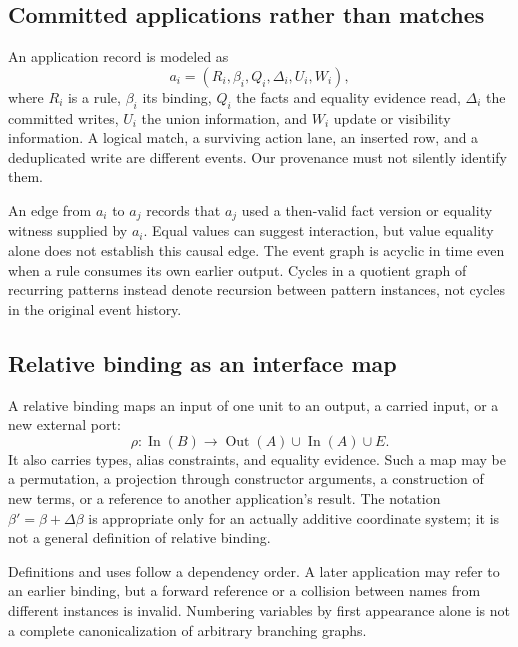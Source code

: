 \documentclass[11pt,a4paper]{article}
\begin{document}
\MathEgraph

\subsection{Committed applications rather than matches}
An application record is modeled as
\begin{equation}
 a_i=(R_i,\beta_i,Q_i,\Delta_i,U_i,W_i),
\end{equation}
where $R_i$ is a rule, $\beta_i$ its binding, $Q_i$ the facts and equality evidence
read, $\Delta_i$ the committed writes, $U_i$ the union information, and $W_i$
update or visibility information. A logical match, a surviving action lane, an
inserted row, and a deduplicated write are different events. Our provenance must
not silently identify them.

An edge from $a_i$ to $a_j$ records that $a_j$ used a then-valid fact version or
equality witness supplied by $a_i$. Equal values can suggest interaction, but
value equality alone does not establish this causal edge. The event graph is
acyclic in time even when a rule consumes its own earlier output. Cycles in a
quotient graph of recurring patterns instead denote recursion between pattern
instances, not cycles in the original event history.

\subsection{Relative binding as an interface map}
A relative binding maps an input of one unit to an output, a carried input, or a
new external port:
\begin{equation}
 \rho:\operatorname{In}(B)\longrightarrow
 \operatorname{Out}(A)\cup\operatorname{In}(A)\cup E.
\end{equation}
It also carries types, alias constraints, and equality evidence. Such a map may
be a permutation, a projection through constructor arguments, a construction of
new terms, or a reference to another application's result. The notation
$\beta'=\beta+\Delta\beta$ is appropriate only for an actually additive coordinate
system; it is not a general definition of relative binding.

Definitions and uses follow a dependency order. A later application may refer to
an earlier binding, but a forward reference or a collision between names from
different instances is invalid. Numbering variables by first appearance alone
is not a complete canonicalization of arbitrary branching graphs.
\end{document}
